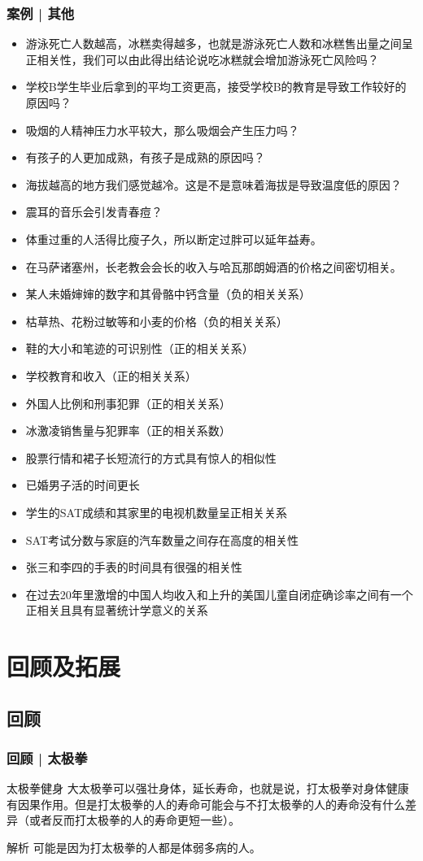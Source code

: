 \begin{frame}
  \frametitle{案例 | 其他}
  \begin{itemize}
    \item 游泳死亡人数越高，冰糕卖得越多，也就是游泳死亡人数和冰糕售出量之间呈正相关性，我们可以由此得出结论说吃冰糕就会增加游泳死亡风险吗？
    \item 学校B学生毕业后拿到的平均工资更高，接受学校B的教育是导致工作较好的原因吗？
    \item 吸烟的人精神压力水平较大，那么吸烟会产生压力吗？
    \item 有孩子的人更加成熟，有孩子是成熟的原因吗？
    \item 海拔越高的地方我们感觉越冷。这是不是意味着海拔是导致温度低的原因？
    \item 震耳的音乐会引发青春痘？
    \item 体重过重的人活得比瘦子久，所以断定过胖可以延年益寿。
    \item 在马萨诸塞州，长老教会会长的收入与哈瓦那朗姆酒的价格之间密切相关。
    \item 某人未婚婶婶的数字和其骨骼中钙含量（负的相关关系）
    \item 枯草热、花粉过敏等和小麦的价格（负的相关关系）
    \item 鞋的大小和笔迹的可识别性（正的相关关系）
    \item 学校教育和收入（正的相关关系）
    \item 外国人比例和刑事犯罪（正的相关关系）
    \item 冰激凌销售量与犯罪率（正的相关系数）
    \item 股票行情和裙子长短流行的方式具有惊人的相似性
    \item 已婚男子活的时间更长
    \item 学生的SAT成绩和其家里的电视机数量呈正相关关系
    \item SAT考试分数与家庭的汽车数量之间存在高度的相关性
    \item 张三和李四的手表的时间具有很强的相关性
    \item 在过去20年里激增的中国人均收入和上升的美国儿童自闭症确诊率之间有一个正相关且具有显著统计学意义的关系
  \end{itemize}
\end{frame}

\section{回顾及拓展}
\subsection{回顾}
\begin{frame}
  \frametitle{回顾 | 太极拳}
  \begin{block}{太极拳健身}
    大太极拳可以强壮身体，延长寿命，也就是说，打太极拳对身体健康有因果作用。但是打太极拳的人的寿命可能会与不打太极拳的人的寿命没有什么差异（或者反而打太极拳的人的寿命更短一些）。
  \end{block}
  \pause
  \begin{block}{解析}
    可能是因为打太极拳的人都是体弱多病的人。
  \end{block}
\end{frame}

